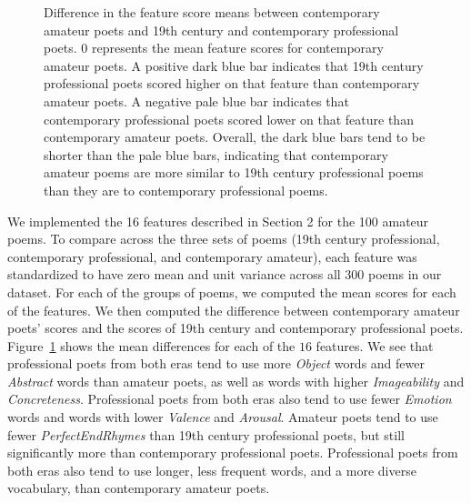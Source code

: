 \documentclass{book}
\begin{document}
\begin{figure}
\caption{Difference in the feature score means between contemporary amateur poets and 19th century and contemporary professional poets. $0$ represents the mean feature scores for contemporary amateur poets. A positive dark blue bar indicates that 19th century professional poets scored higher on that feature than contemporary amateur poets. A negative pale blue bar indicates that contemporary professional poets scored lower on that feature than contemporary amateur poets. Overall, the dark blue bars tend to be shorter than the pale blue bars, indicating that contemporary amateur poems are more similar to 19th century professional poems than they are to contemporary professional poems.} 
\label{fig3}
\end{figure}

We implemented the 16 features described in Section 2 for the 100 amateur poems. To compare across the three sets of poems (19th century professional, contemporary professional, and contemporary amateur), each feature was standardized to have zero mean and unit variance across all 300 poems in our dataset. For each of the groups of poems, we computed the mean scores for each of the features. We then computed the difference between contemporary amateur poets' scores and the scores of 19th century and contemporary professional poets. Figure~\ref{fig3} shows the mean differences for each of the $16$ features. We see that professional poets from both eras tend to use more \emph{Object} words and fewer \emph{Abstract} words than amateur poets, as well as words with higher \emph{Imageability} and \emph{Concreteness}. Professional poets from both eras also tend to use fewer \emph{Emotion} words and words with lower \emph{Valence} and \emph{Arousal}. Amateur poets tend to use fewer \emph{PerfectEndRhymes} than 19th century professional poets, but still significantly more than contemporary professional poets. Professional poets from both eras also tend to use longer, less frequent words, and a more diverse vocabulary, than contemporary amateur poets.
\end{document}
